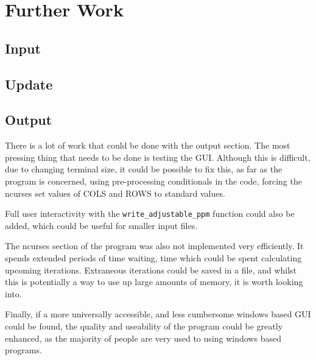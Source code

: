 \section{Further Work}
\subsection{Input}
\subsection{Update}
\subsection{Output}
	There is a lot of work that could be done with the output section.
	The most pressing thing that needs to be done is testing the GUI.
	Although this is difficult, due to changing terminal size, it could be possible to fix this, as far as the program is concerned, using
	pre-processing conditionals in the code, forcing the ncurses set values of COLS and ROWS to standard values.
	
	Full user interactivity with the \texttt{write\_adjustable\_ppm} function could also be added, which could be useful for smaller input files.

	The ncurses section of the program was also not implemented very efficiently.
	It spends extended periods of time waiting, time which could be spent calculating upcoming iterations.
	Extraneous iterations could be saved in a file, and whilst this is potentially a way to use up large amounts of memory, it is worth looking into.
	
	Finally, if a more universally accessible, and less cumbersome windows based GUI could be found, the quality and useability of the program could be greatly enhanced, as the majority of people are very used to using windows based programs.
